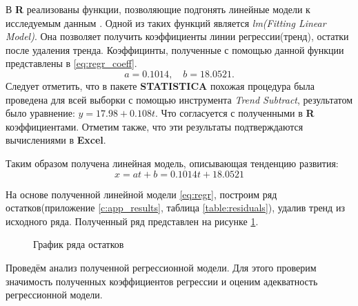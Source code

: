 В \textbf{R} реализованы функции, позволяющие подгонять линейные модели к исследуемым данным \cite{Shumway2006Time}. Одной из таких функций является \textit{lm(Fitting Linear Model)}. Она позволяет получить коэффициенты линии регрессии(тренд), остатки после удаления тренда. Коэффицинты, полученные с помощью данной функции представлены в \eqref{eq:regr_coeff}.
\begin{equation}
\label{eq:regr_coeff}
	a = 0.1014, \quad b = 18.0521.
\end{equation}
Следует отметить, что в пакете \textbf{STATISTICA} похожая процедура была проведена для всей выборки с помощью инструмента \textit{Trend Subtract}, результатом было уравнение: $y=17.98+0.108t$. Что согласуется с полученными в \textbf{R} коэффициентами. Отметим также, что эти результаты подтверждаются вычислениями в \textbf{Excel}.

Таким образом получена линейная модель, описывающая тенденцию развития:
\begin{equation}
\label{eq:regr}
	x = at + b = 0.1014t + 18.0521
\end{equation}

На основе полученной линейной модели \eqref{eq:regr}, построим ряд остатков(приложение \ref{c:app_results}, таблица \ref{table:residuals}), удалив тренд из исходного ряда. Полученный ряд представлен на рисунке \ref{img:ts_detrended}.
\begin{figure}[ht]
\caption{График ряда остатков}
\label{img:ts_detrended}
\end{figure}


Проведём анализ полученной регрессионной модели. Для этого проверим значимость полученных коэффициентов регрессии и оценим адекватность регрессионной модели.

